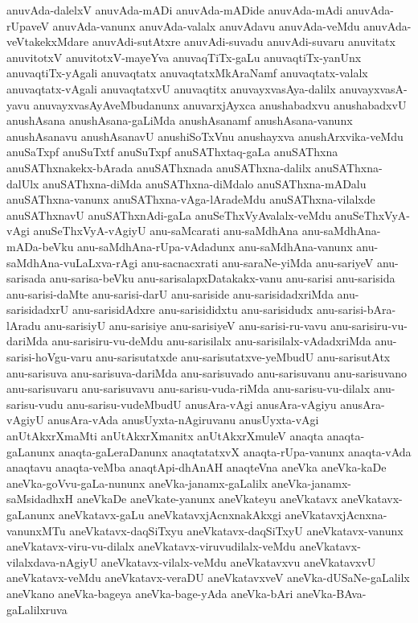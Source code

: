 {anuvAda-dalelxV
anuvAda-mADi
anuvAda-mADide
anuvAda-mAdi
anuvAda-rUpaveV
anuvAda-vanunx
anuvAda-valalx
anuvAdavu
anuvAda-veMdu
anuvAda-veVtakekxMdare
anuvAdi-sutAtxre
anuvAdi-suvadu
anuvAdi-suvaru
anuvitatx
anuvitotxV
anuvitotxV-mayeYva
anuvaqTiTx-gaLu
anuvaqtiTx-yanUnx
anuvaqtiTx-yAgali
anuvaqtatx
anuvaqtatxMkAraNamf
anuvaqtatx-valalx
anuvaqtatx-vAgali
anuvaqtatxvU
anuvaqtitx
anuvayxvasAya-dalilx
anuvayxvasA-yavu
anuvayxvasAyAveMbudanunx
anuvarxjAyxca
anushabadxvu
anushabadxvU
anushAsana
anushAsana-gaLiMda
anushAsanamf
anushAsana-vanunx
anushAsanavu
anushAsanavU
anushiSoTxVnu
anushayxva
anushArxvika-veMdu
anuSaTxpf
anuSuTxtf
anuSuTxpf
anuSAThxtaq-gaLa
anuSAThxna
anuSAThxnakekx-bArada
anuSAThxnada
anuSAThxna-dalilx
anuSAThxna-dalUlx
anuSAThxna-diMda
anuSAThxna-diMdalo
anuSAThxna-mADalu
anuSAThxna-vanunx
anuSAThxna-vAga-lAradeMdu
anuSAThxna-vilalxde
anuSAThxnavU
anuSAThxnAdi-gaLa
anuSeThxVyAvalalx-veMdu
anuSeThxVyA-vAgi
anuSeThxVyA-vAgiyU
anu-saMcarati
anu-saMdhAna
anu-saMdhAna-mADa-beVku
anu-saMdhAna-rUpa-vAdadunx
anu-saMdhAna-vanunx
anu-saMdhAna-vuLaLxva-rAgi
anu-sacnacxrati
anu-saraNe-yiMda
anu-sariyeV
anu-sarisada
anu-sarisa-beVku
anu-sarisalapxDatakakx-vanu
anu-sarisi
anu-sarisida
anu-sarisi-daMte
anu-sarisi-darU
anu-sariside
anu-sarisidadxriMda
anu-sarisidadxrU
anu-sarisidAdxre
anu-sarisididxtu
anu-sarisidudx
anu-sarisi-bAra-lAradu
anu-sarisiyU
anu-sarisiye
anu-sarisiyeV
anu-sarisi-ru-vavu
anu-sarisiru-vu-dariMda
anu-sarisiru-vu-deMdu
anu-sarisilalx
anu-sarisilalx-vAdadxriMda
anu-sarisi-hoVgu-varu
anu-sarisutatxde
anu-sarisutatxve-yeMbudU
anu-sarisutAtx
anu-sarisuva
anu-sarisuva-dariMda
anu-sarisuvado
anu-sarisuvanu
anu-sarisuvano
anu-sarisuvaru
anu-sarisuvavu
anu-sarisu-vuda-riMda
anu-sarisu-vu-dilalx
anu-sarisu-vudu
anu-sarisu-vudeMbudU
anusAra-vAgi
anusAra-vAgiyu
anusAra-vAgiyU
anusAra-vAda
anusUyxta-nAgiruvanu
anusUyxta-vAgi
anUtAkxrXmaMti
anUtAkxrXmanitx
anUtAkxrXmuleV
anaqta
anaqta-gaLanunx
anaqta-gaLeraDanunx
anaqtatatxvX
anaqta-rUpa-vanunx
anaqta-vAda
anaqtavu
anaqta-veMba
anaqtApi-dhAnAH
anaqteVna
aneVka
aneVka-kaDe
aneVka-goVvu-gaLa-nununx
aneVka-janamx-gaLalilx
aneVka-janamx-saMsidadhxH
aneVkaDe
aneVkate-yanunx
aneVkateyu
aneVkatavx
aneVkatavx-gaLanunx
aneVkatavx-gaLu
aneVkatavxjAcnxnakAkxgi
aneVkatavxjAcnxna-vanunxMTu
aneVkatavx-daqSiTxyu
aneVkatavx-daqSiTxyU
aneVkatavx-vanunx
aneVkatavx-viru-vu-dilalx
aneVkatavx-viruvudilalx-veMdu
aneVkatavx-vilalxdava-nAgiyU
aneVkatavx-vilalx-veMdu
aneVkatavxvu
aneVkatavxvU
aneVkatavx-veMdu
aneVkatavx-veraDU
aneVkatavxveV
aneVka-dUSaNe-gaLalilx
aneVkano
aneVka-bageya
aneVka-bage-yAda
aneVka-bAri
aneVka-BAva-gaLalilxruva
}

